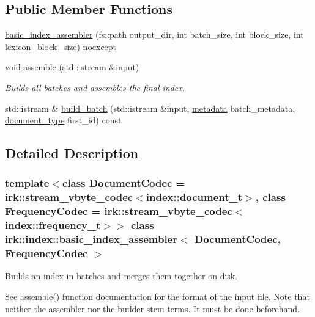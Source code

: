 \subsection*{Public Member Functions}
\begin{DoxyCompactItemize}
\item 
\mbox{\hyperlink{classirk_1_1index_1_1basic__index__assembler_a36359e7becf0176d17c24b7b9c8d59bb}{basic\+\_\+index\+\_\+assembler}} (fs\+::path output\+\_\+dir, int batch\+\_\+size, int block\+\_\+size, int lexicon\+\_\+block\+\_\+size) noexcept
\item 
void \mbox{\hyperlink{classirk_1_1index_1_1basic__index__assembler_ad5d719c185d511614fd008757bfc27e3}{assemble}} (std\+::istream \&input)
\begin{DoxyCompactList}\small\item\em Builds all batches and assembles the final index. \end{DoxyCompactList}\item 
std\+::istream \& \mbox{\hyperlink{classirk_1_1index_1_1basic__index__assembler_a192d5783c1b7a836f9e96e04ef317b22}{build\+\_\+batch}} (std\+::istream \&input, \mbox{\hyperlink{structirk_1_1index_1_1metadata}{metadata}} batch\+\_\+metadata, \mbox{\hyperlink{classirk_1_1index_1_1basic__index__assembler_ae4f97ba949d5359dc425b034f6fc319d}{document\+\_\+type}} first\+\_\+id) const
\end{DoxyCompactItemize}


\subsection{Detailed Description}
\subsubsection*{template$<$class Document\+Codec = irk\+::stream\+\_\+vbyte\+\_\+codec$<$index\+::document\+\_\+t$>$, class Frequency\+Codec = irk\+::stream\+\_\+vbyte\+\_\+codec$<$index\+::frequency\+\_\+t$>$$>$\newline
class irk\+::index\+::basic\+\_\+index\+\_\+assembler$<$ Document\+Codec, Frequency\+Codec $>$}

Builds an index in batches and merges them together on disk.

See \mbox{\hyperlink{classirk_1_1index_1_1basic__index__assembler_ad5d719c185d511614fd008757bfc27e3}{assemble()}} function documentation for the format of the input file. Note that neither the assembler nor the builder stem terms. It must be done beforehand. 

